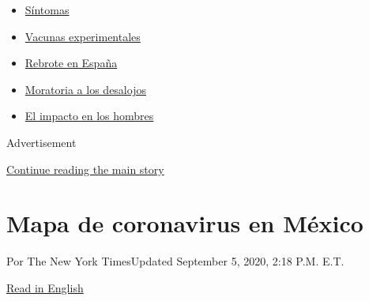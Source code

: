 \begin{itemize}
\tightlist
\item
  \href{https://www.nytimes3xbfgragh.onion/es/interactive/2020/08/06/espanol/ciencia-y-tecnologia/tengo-covid-19-sintomas.html?name=styln-coronavirus-es\&region=TOP_BANNER\&block=storyline_menu_recirc\&action=click\&pgtype=Interactive\&impression_id=3e63eb81-efbb-11ea-9dab-d14fdfb8999f\&variant=undefined}{Síntomas}
\item
  \href{https://www.nytimes3xbfgragh.onion/es/2020/09/02/espanol/ciencia-y-tecnologia/vacunas-experimentales-coronavirus.html?name=styln-coronavirus-es\&region=TOP_BANNER\&block=storyline_menu_recirc\&action=click\&pgtype=Interactive\&impression_id=3e63eb82-efbb-11ea-9dab-d14fdfb8999f\&variant=undefined}{Vacunas
  experimentales}
\item
  \href{https://www.nytimes3xbfgragh.onion/es/2020/08/31/espanol/mundo/rebrote-espana.html?name=styln-coronavirus-es\&region=TOP_BANNER\&block=storyline_menu_recirc\&action=click\&pgtype=Interactive\&impression_id=3e63eb83-efbb-11ea-9dab-d14fdfb8999f\&variant=undefined}{Rebrote
  en España}
\item
  \href{https://www.nytimes3xbfgragh.onion/es/2020/09/02/espanol/negocios/desalojos-trump.html?name=styln-coronavirus-es\&region=TOP_BANNER\&block=storyline_menu_recirc\&action=click\&pgtype=Interactive\&impression_id=3e63eb84-efbb-11ea-9dab-d14fdfb8999f\&variant=undefined}{Moratoria
  a los desalojos}
\item
  \href{https://www.nytimes3xbfgragh.onion/es/2020/08/26/espanol/ciencia-y-tecnologia/coronavirus-afecta-hombres.html?name=styln-coronavirus-es\&region=TOP_BANNER\&block=storyline_menu_recirc\&action=click\&pgtype=Interactive\&impression_id=3e63eb85-efbb-11ea-9dab-d14fdfb8999f\&variant=undefined}{El
  impacto en los hombres}
\end{itemize}

Advertisement

\protect\hyperlink{after-top}{Continue reading the main story}

\hypertarget{mapa-de-coronavirus-en-muxe9xico}{%
\section{Mapa de coronavirus en
México}\label{mapa-de-coronavirus-en-muxe9xico}}

Por The New York TimesUpdated September 5, 2020, 2:18 P.M. E.T.

\href{https://www.nytimes3xbfgragh.onion/interactive/2020/world/americas/mexico-coronavirus-cases.html}{Read
in English}

